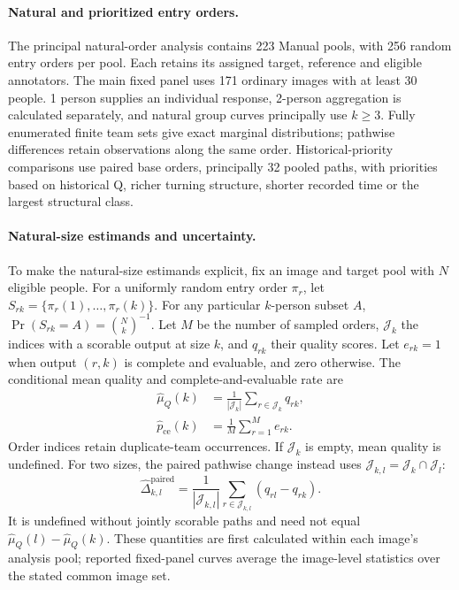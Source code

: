 \paragraph{Natural and prioritized entry orders.}
The principal natural-order analysis contains 223 Manual pools, with 256 random entry orders per pool. Each retains its assigned target, reference and eligible annotators. The main fixed panel uses 171 ordinary images with at least 30 people. 1 person supplies an individual response, 2-person aggregation is calculated separately, and natural group curves principally use \(k\geq3\). Fully enumerated finite team sets give exact marginal distributions; pathwise differences retain observations along the same order. Historical-priority comparisons use paired base orders, principally 32 pooled paths, with priorities based on historical Q, richer turning structure, shorter recorded time or the largest structural class.

\paragraph{Natural-size estimands and uncertainty.}
To make the natural-size estimands explicit, fix an image and target pool with \(N\) eligible people. For a uniformly random entry order \(\pi_r\), let \(S_{rk}=\{\pi_r(1),\ldots,\pi_r(k)\}\). For any particular \(k\)-person subset \(A\), \(\Pr(S_{rk}=A)=\binom Nk^{-1}\). Let \(M\) be the number of sampled orders, \(\mathcal J_k\) the indices with a scorable output at size \(k\), and \(q_{rk}\) their quality scores. Let \(e_{rk}=1\) when output \((r,k)\) is complete and evaluable, and zero otherwise. The conditional mean quality and complete-and-evaluable rate are
\begin{equation}
 \begin{aligned}
 \widehat\mu_Q(k)&=\frac{1}{|\mathcal J_k|}\sum_{r\in\mathcal J_k}q_{rk},\\
 \widehat p_{\mathrm{ce}}(k)&=\frac1M\sum_{r=1}^{M}e_{rk}.
 \end{aligned}
 \label{eq:natural-outcomes}
\end{equation}
Order indices retain duplicate-team occurrences. If \(\mathcal J_k\) is empty, mean quality is undefined. For two sizes, the paired pathwise change instead uses \(\mathcal J_{k,l}=\mathcal J_k\cap\mathcal J_l\):
\begin{equation}
 \widehat\Delta_{k,l}^{\mathrm{paired}}
 =\frac{1}{|\mathcal J_{k,l}|}\sum_{r\in\mathcal J_{k,l}}
 (q_{rl}-q_{rk}).
 \label{eq:paired-size-change}
\end{equation}
It is undefined without jointly scorable paths and need not equal \(\widehat\mu_Q(l)-\widehat\mu_Q(k)\). These quantities are first calculated within each image's analysis pool; reported fixed-panel curves average the image-level statistics over the stated common image set.


